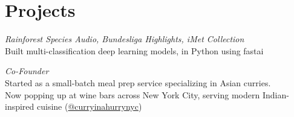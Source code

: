 \documentclass[a4paper]{deedy-resume-openfont} %
\begin{document}
\begin{minipage}[t]{0.33\textwidth}






\section{Projects}
\textit{ Rainforest Species Audio, Bundesliga Highlights, iMet Collection}\\
Built multi-classification deep learning models, in Python using fastai
\sectionsep

\textit{Co-Founder}\\
Started as a small-batch meal prep service specializing in Asian curries.\\
Now popping up at wine bars across New York City, serving modern Indian-inspired cuisine (\href{https://www.instagram.com/curryinahurrynyc/}{@curryinahurrynyc})



\end{minipage}
\end{document}
